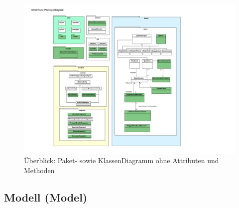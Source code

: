 \documentclass[a4paper]{scrreprt}
\begin{document}
                \begin{figure}[H]
                    \centering
                    \includegraphics[scale = 0.9]{Images/PackageDiagram.pdf}
                    \caption{Überblick: Paket- sowie KlassenDiagramm ohne Attributen und Methoden}
                \end{figure}

            \subsection{Modell (Model)}
\end{document}
